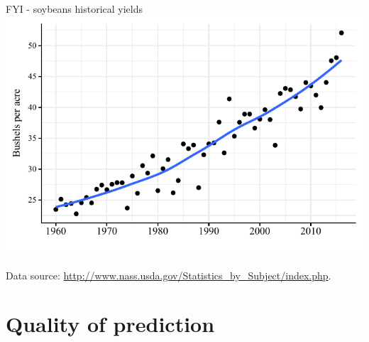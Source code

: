\documentclass[table,xcolor=pdftex,dvipsnames, handout]{beamer}\usepackage[]{graphicx}\usepackage[]{color}
\makeatletter
\def\maxwidth{ %
  \ifdim\Gin@nat@width>\linewidth
    \linewidth
  \else
    \Gin@nat@width
  \fi
}
\newenvironment{knitrout}{}{} %
\makeatother
\begin{document}

\begin{frame}{FYI - soybeans historical yields}
\begin{knitrout}
\color{fgcolor}
\includegraphics[width=\maxwidth]{figure/figure_soybean_yield2-1} 

\end{knitrout}
\scriptsize
Data source: \url{http://www.nass.usda.gov/Statistics_by_Subject/index.php}.
\end{frame}


\section{Quality of prediction}
\end{document}

